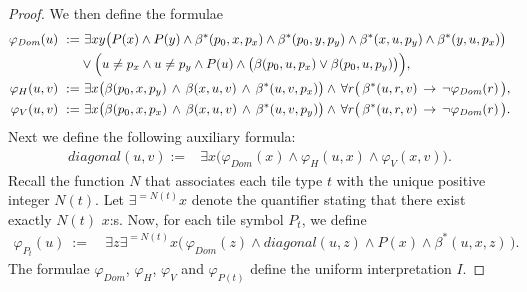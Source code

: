 \documentclass{LMCS}
\theoremstyle{plain}
\newcommand{\mf}{\mathfrak}
\newcommand{\mi}{\mathit}
\begin{document}
\begin{proof}
%
%
%
%
%
%
%
%
%
%
%
%
%
%
%
%
%
%
We then define the formulae
%
%
%
\begin{align*}
%
\varphi_{\mi{Dom}}(u)\ := &\ \exists x y\big(P(x)\wedge P(y)\wedge\beta^*(p_0,x,p_x)\wedge\beta^*(p_0,y,p_y)\wedge\beta^*(x,u,p_y)\wedge\beta^*(y,u,p_x)\big)\\
&\vee \Bigl(u\neq p_x\wedge u\neq p_y\wedge P(u)\wedge \bigl(\beta(p_0,u,p_x)\vee\beta(p_0,u,p_y)\bigr) \Bigr),\\
%
%
%
%
\varphi_{H}(u,v)\ :=&\ 
%
\exists x \bigl(\beta(p_0,x,p_y)\, \wedge\, \beta(x,u,v)\, \wedge\, \beta^*(u,v,p_x)\bigr)
%
\wedge\, \forall r\bigl(\, \beta^*(u,r,v)\, \rightarrow\, \neg \varphi_{\mi{Dom}}(r)\, \bigr),\\
%
\varphi_{V}(u,v)\ :=&\ 
%
\exists x \bigl(\beta(p_0,x,p_x)\, \wedge\, \beta(x,u,v)\, \wedge\, \beta^*(u,v,p_y)\bigr)
%
\wedge\, \forall r\bigl(\, \beta^*(u,r,v)\, \rightarrow\, \neg \varphi_{\mi{Dom}}(r)\, \bigr).
%
\end{align*}
%
%
%
Next we define the following auxiliary formula:
%
%
%
\begin{align*}
%
\mi{diagonal}(u,v):=&
\exists x\bigl( \varphi_\mi{Dom}(x)\wedge \varphi_\mi{H}(u,x)\wedge\varphi_\mi{V}(x,v)\bigr).
\end{align*}
%
%
%
Recall the function $N$ that associates each tile type $t$ with the unique positive integer $N(t)$.
%
Let $\exists^{=N(t)}x$ denote the quantifier stating that there exist exactly $N(t)$ $x$:s.
%
Now, for each tile symbol $P_t$, we define
%
%
%
\begin{align*}
%
\varphi_{P_t}(u)\ :=&\ 
%
\exists z \exists^{=N(t)} x \bigl(\, 
%
\varphi_\mi{Dom}(z)\wedge\mi{diagonal}(u,z) \wedge P(x)\wedge \beta^*(u,x,z)\,  \bigr).
%
\end{align*}
%
%
%
The formulae
%
$\varphi_{\mi{Dom}}$, $\varphi_\mi{H}$, $\varphi_\mi{V}$ and $\varphi_{P(t)}$
%
define the uniform interpretation $I$.
%




\end{proof}
\end{document}
